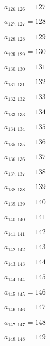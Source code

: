 \documentclass[a4paper,12pt]{article}
\begin{document}
$a _{ 126, 126 } = 127$

$a _{ 127, 127 } = 128$

$a _{ 128, 128 } = 129$

$a _{ 129, 129 } = 130$

$a _{ 130, 130 } = 131$

$a _{ 131, 131 } = 132$

$a _{ 132, 132 } = 133$

$a _{ 133, 133 } = 134$

$a _{ 134, 134 } = 135$

$a _{ 135, 135 } = 136$

$a _{ 136, 136 } = 137$

$a _{ 137, 137 } = 138$

$a _{ 138, 138 } = 139$

$a _{ 139, 139 } = 140$

$a _{ 140, 140 } = 141$

$a _{ 141, 141 } = 142$

$a _{ 142, 142 } = 143$

$a _{ 143, 143 } = 144$

$a _{ 144, 144 } = 145$

$a _{ 145, 145 } = 146$

$a _{ 146, 146 } = 147$

$a _{ 147, 147 } = 148$

$a _{ 148, 148 } = 149$
\end{document}
